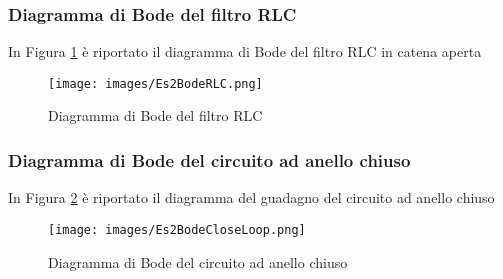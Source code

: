 \subsubsection{Diagramma di Bode del filtro RLC}
In Figura \ref{fig:Es2BodeRLC} è riportato il diagramma di Bode del filtro RLC in catena aperta
\begin{figure}[H]
    \centering
    \texttt{[image: images/Es2BodeRLC.png]}
    \caption{Diagramma di Bode del filtro RLC}
    \label{fig:Es2BodeRLC}
\end{figure}
\clearpage
\subsubsection{Diagramma di Bode del circuito ad anello chiuso}
In Figura \ref{fig:Es2BodeCloseLoop} è riportato il diagramma del guadagno del circuito ad anello chiuso
\begin{figure}[H]
    \centering
    \texttt{[image: images/Es2BodeCloseLoop.png]}
    \caption{Diagramma di Bode del circuito ad anello chiuso}
    \label{fig:Es2BodeCloseLoop}
\end{figure}





